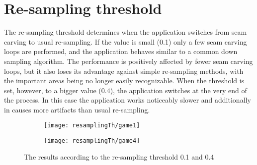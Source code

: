 \documentclass[draft,final]{vutinfth} %
\begin{document}
	\section{Re-sampling threshold}
	The re-sampling threshold determines when the application switches from seam carving to usual re-sampling. 
	If the value is small (0.1) only a few seam carving loops are performed, and the application behaves similar to a common down sampling algorithm.
	The performance is positively affected by fewer seam carving loops, but it also loses its advantage against simple re-sampling methods, with the important areas being no longer easily recognizable.
	When the threshold is set, however, to a bigger value (0.4), the application switches at the very end of the process.
	In this case the application works noticeably slower and additionally in causes more artifacts than usual re-sampling.
	\begin{figure}[H]
		\centering
		\begin{subfigure}[b]{0.45\columnwidth}
			\centering
			\texttt{[image: resamplingTh/game1]}
			\label{fig:res:th1}
		\end{subfigure}
		\begin{subfigure}[b]{0.45\columnwidth}
			\centering
			\texttt{[image: resamplingTh/game4]}
			\label{fig:res:th2}
		\end{subfigure}
		\caption{The results according to the re-sampling threshold 0.1 and 0.4}
	\end{figure}  
\end{document}
